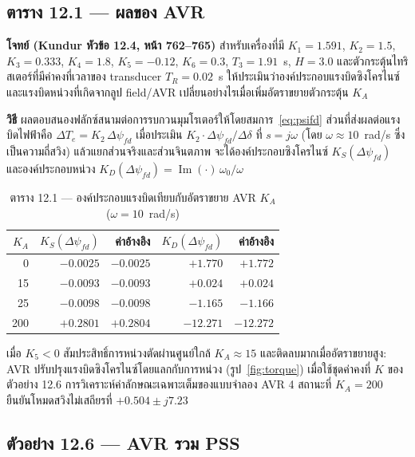 \documentclass[12pt,a4paper]{article}
\newcommand{\ddel}{\Delta\delta}
\newcommand{\dpsifd}{\Delta\psi_{fd}}
\begin{document}
\subsection{ตาราง 12.1 --- ผลของ AVR}
\label{sec:avr}

\textbf{โจทย์ (Kundur หัวข้อ 12.4, หน้า 762--765)}
สำหรับเครื่องที่มี $K_1=1.591$, $K_2=1.5$, $K_3=0.333$, $K_4=1.8$,
$K_5=-0.12$, $K_6=0.3$, $T_3=1.91$~s, $H=3.0$
และตัวกระตุ้นไทริสเตอร์ที่มีค่าคงที่เวลาของ transducer $T_R=0.02$~s
ให้ประเมินว่าองค์ประกอบแรงบิดซิงโครไนซ์และแรงบิดหน่วงที่เกิดจากลูป field/AVR
เปลี่ยนอย่างไรเมื่อเพิ่มอัตราขยายตัวกระตุ้น $K_A$

\textbf{วิธี} ผลตอบสนองฟลักซ์สนามต่อการรบกวนมุมโรเตอร์ให้โดยสมการ~\eqref{eq:psifd}
ส่วนที่ส่งผลต่อแรงบิดไฟฟ้าคือ $\Delta T_e = K_2\,\dpsifd$
เมื่อประเมิน $K_2\cdot\dpsifd/\ddel$ ที่ $s=j\omega$
(โดย $\omega \approx 10$~rad/s ซึ่งเป็นความถี่สวิง)
แล้วแยกส่วนจริงและส่วนจินตภาพ จะได้องค์ประกอบซิงโครไนซ์ $K_S(\dpsifd)$
และองค์ประกอบหน่วง
$K_D(\dpsifd) = \operatorname{Im}(\cdot)\,\omega_0/\omega$

\begin{table}[H]
\centering
\caption{ตาราง 12.1 --- องค์ประกอบแรงบิดเทียบกับอัตราขยาย AVR $K_A$ ($\omega=10$~rad/s)}
\label{tab:modelC}
\begin{tabular}{@{}rrrrr@{}}
\toprule
$K_A$ & $K_S(\dpsifd)$ & ค่าอ้างอิง & $K_D(\dpsifd)$ & ค่าอ้างอิง \\
\midrule
0   & $-0.0025$ & $-0.0025$ & $+1.770$  & $+1.772$ \\
15  & $-0.0093$ & $-0.0093$ & $+0.024$  & $+0.024$ \\
25  & $-0.0098$ & $-0.0098$ & $-1.165$  & $-1.166$ \\
200 & $+0.2801$ & $+0.2804$ & $-12.271$ & $-12.272$ \\
\bottomrule
\end{tabular}
\end{table}

เมื่อ $K_5<0$ สัมประสิทธิ์การหน่วงตัดผ่านศูนย์ใกล้ $K_A\approx15$
และติดลบมากเมื่ออัตราขยายสูง:
AVR ปรับปรุงแรงบิดซิงโครไนซ์โดยแลกกับการหน่วง (รูป~\ref{fig:torque})
เมื่อใช้ชุดค่าคงที่ $K$ ของตัวอย่าง 12.6
การวิเคราะห์ค่าลักษณะเฉพาะเต็มของแบบจำลอง AVR 4 สถานะที่ $K_A=200$
ยืนยันโหมดสวิงไม่เสถียรที่ $+0.504\pm j7.23$

\subsection{ตัวอย่าง 12.6 --- AVR รวม PSS}
\label{sec:pss}
\end{document}
